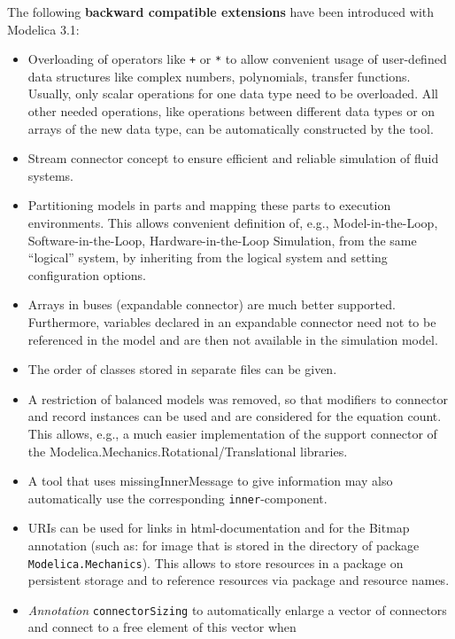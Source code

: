 The following \textbf{backward compatible extensions} have been
introduced with Modelica 3.1:

\begin{itemize}
\item
  Overloading of operators like \lstinline!+! or \lstinline!*! to allow convenient usage of
  user-defined data structures like complex numbers, polynomials,
  transfer functions. Usually, only scalar operations for one data type
  need to be overloaded. All other needed operations, like operations
  between different data types or on arrays of the new data type, can be
  automatically constructed by the tool.
\item
  Stream connector concept to ensure efficient and reliable simulation
  of fluid systems.
\item
  Partitioning models in parts and mapping these parts to execution
  environments. This allows convenient definition of, e.g.,
  Model-in-the-Loop, Software-in-the-Loop, Hardware-in-the-Loop
  Simulation, from the same ``logical'' system, by inheriting from the
  logical system and setting configuration options.
\item
  Arrays in buses (expandable connector) are much better supported.
  Furthermore, variables declared in an expandable connector need not to
  be referenced in the model and are then not available in the
  simulation model.
\item
  The order of classes stored in separate files can be given.
\item
  A restriction of balanced models was removed, so that modifiers to
  connector and record instances can be used and are considered for the
  equation count. This allows, e.g., a much easier implementation of the
  support connector of the Modelica.Mechanics.Rotational/Translational
  libraries.
\item
  A tool that uses missingInnerMessage to give information may also
  automatically use the corresponding \lstinline!inner!-component.
\item
  URIs can be used for links in html-documentation and for the Bitmap
  annotation (such as:  for image
   that is stored in the directory of package
  \lstinline!Modelica.Mechanics!). This allows to store resources in a package on
  persistent storage and to reference resources via package and resource
  names.
\item
  \emph{Annotation} \lstinline!connectorSizing! to automatically enlarge a
  vector of connectors and connect to a free element of this vector when

\end{itemize}
